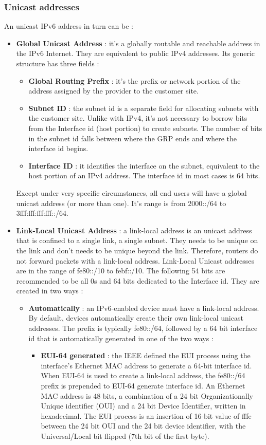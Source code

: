\documentclass[11pt]{article}
\begin{document}
\subsubsection{Unicast addresses}
An unicast IPv6 address in turn can be :
\begin{itemize}
\item \textbf{Global Unicast Address} : it's a globally routable and reachable address in the IPv6 Internet. They are equivalent to public IPv4 addresses. Its generic structure has three fields :
\begin{itemize}
\item \textbf{Global Routing Prefix} : it's the prefix or network portion of the address assigned by the provider to the customer site.
\item \textbf{Subnet ID} : the subnet id is a separate field for allocating subnets with the customer site. Unlike with IPv4, it's not necessary to borrow bits from the Interface id (host portion) to create subnets. The number of bits in the subnet id falls between where the GRP ends and where the interface id begins.
\item \textbf{Interface ID} : it identifies the interface on the subnet, equivalent to the host portion of an IPv4 address. The interface id in most cases is 64 bits.
\end{itemize}
 Except under very specific circumstances, all end users will have a global unicast address (or more than one). It's range is from 2000::/64 to 3fff:fff:fff:fff::/64.
\item \textbf{Link-Local Unicast Address} : a link-local address is an unicast address that is confined to a single link, a single subnet. They needs to be unique on the link and don't needs to be unique beyond the link. Therefore, routers do not forward packets with a link-local address. Link-Local Unicast  addresses are in the range of fe80::/10 to febf::/10. The following 54 bits are recommended to be all 0s and 64 bits dedicated to the Interface id. They are created in two ways :
\begin{itemize}
\item \textbf{Automatically} : an IPv6-enabled device must have a link-local address. By default, devices automatically create their own link-local unicast addresses. The prefix is typically fe80::/64, followed by a 64 bit interface id that is automatically generated in one of the two ways :
\begin{itemize}
\item \textbf{EUI-64 generated} : the IEEE defined the EUI process using the interface's Ethernet MAC address to generate a 64-bit interface id. When EUI-64 is used to create a link-local address, the fe80::/64 prefix is prepended to EUI-64 generate interface id. An Ethernet MAC address is 48  bits, a combination of a 24 bit Organizationally Unique identifier (OUI) and a 24 bit Device Identifier, written in hexadecimal. The EUI process is an insertion of 16-bit value of fffe between the 24 bit OUI and the 24 bit device identifier, with the Universal/Local bit flipped (7th bit of the first byte).       

\end{itemize}
\end{itemize}
\end{itemize}
\end{document}
